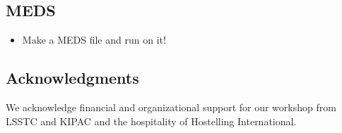 \documentclass[\docopts]{\docclass}
\begin{document}
\subsection{MEDS}
\begin{itemize}
\item Make a MEDS file and run on it!
\end{itemize}



\subsection*{Acknowledgments}

We acknowledge financial and organizational support for our workshop from LSSTC and KIPAC and the hospitality of Hostelling International.





\end{document}
